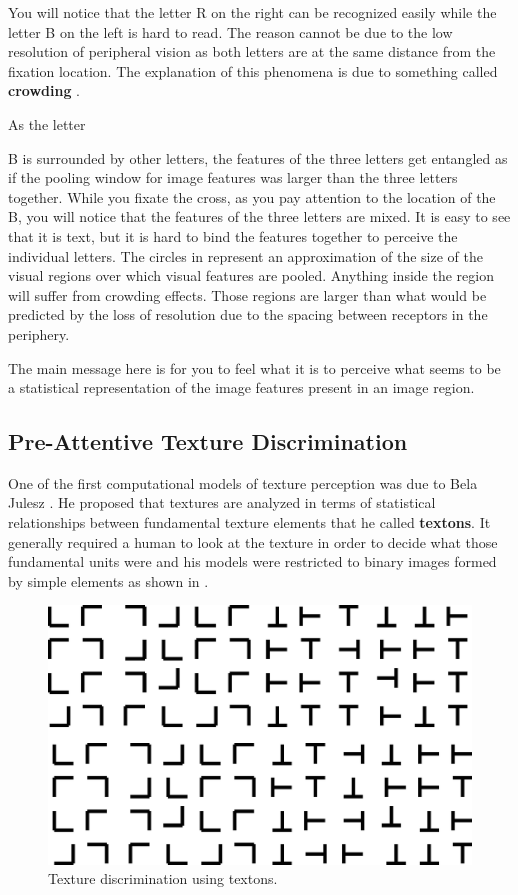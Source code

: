 You will notice that the letter R on the right can be recognized easily while the letter B on the left is hard to read. The reason cannot be due to the low resolution of peripheral vision as both letters are at the same distance from the fixation location. The explanation of this phenomena is due to something called {\bf crowding} \cite{Pell2007}.



As the letter {B is surrounded by other letters, the features of the three letters get entangled as if the pooling window for image features was larger than the three letters together. While you fixate the cross, as you pay attention to the location of the B, you will notice that the features of the three letters are mixed. It is easy to see that it is text, but it is hard to bind the features together to perceive the individual letters. The circles in \fig{\ref{fig:crowding}} represent an approximation of the size of the visual regions over which visual features are pooled. Anything inside the region will suffer from crowding effects. Those regions are larger than what would be predicted by the loss of resolution due to the spacing between receptors in the periphery.

The main message here is for you to feel what it is to perceive what seems to be a statistical representation of the image features present in an image region. 


\subsection{Pre-Attentive Texture Discrimination}

One of the first computational models of texture perception was due to Bela Julesz \cite{Julesz1981}. He proposed that textures are analyzed in terms of statistical relationships between fundamental texture elements that he called {\bf textons}. 
It generally required a human to look at the texture in order to decide what those fundamental units were and his models were restricted to binary images formed by simple elements as shown in \fig{\ref{fig:julez_texture}}.


\begin{figure}
\centerline{
\includegraphics[width=.9\linewidth]{figures/heeger_bergen/julez.eps}
}
\caption{Texture discrimination using textons.  
}
\label{fig:julez_texture}
\end{figure}

}
